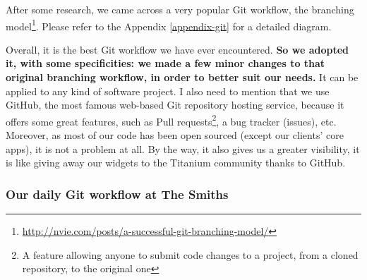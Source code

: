 \medskip

After some research, we came across a very popular Git workflow, the branching model\footnote{\href{http://nvie.com/posts/a-successful-git-branching-model/}{http://nvie.com/posts/a-successful-git-branching-model/}}. Please refer to the Appendix \ref{appendix-git} for a detailed diagram.

\medskip

Overall, it is the best Git workflow we have ever encountered. \textbf{So we adopted it, with some specificities: we made a few minor changes to that original branching workflow, in order to better suit our needs.} It can be applied to any kind of software project. I also need to mention that we use GitHub, the most famous web-based Git repository hosting service, because it offers some great features, such as Pull requests\footnote{A feature allowing anyone to submit code changes to a project, from a cloned repository, to the original one}, a bug tracker (issues), etc. Moreover, as most of our code has been open sourced (except our clients' core apps), it is not a problem at all. By the way, it also gives us a greater visibility, it is like giving away our widgets to the Titanium community thanks to GitHub.

\subsubsection{Our daily Git workflow at The Smiths}

